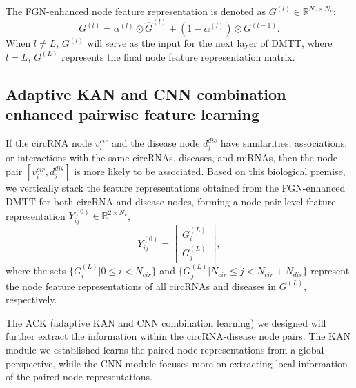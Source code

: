 \documentclass{bioinfo}
\begin{document}
\begin{methods}
The FGN-enhanced node feature representation is denoted as ${G}^{(l)} \in \mathbb{R}^{N_v \times N_v}$:
\begin{equation}
    {G}^{(l)} =  \alpha^{(l)} \odot \hat{G}^{(l)} + (1 - \alpha^{(l)}) \odot G^{(l - 1)}.
\end{equation}
When $l \neq L$, $G^{(l)}$ will serve as the input for the next layer of DMTT, where $l = L$, $G^{(L)}$ represents the final node feature representation matrix.

\vspace{0.3cm}


\subsection{Adaptive KAN and CNN combination enhanced pairwise feature learning}
If the circRNA node $v_i^{cir}$ and the disease node $d_j^{dis}$ have similarities, associations, or interactions with the same circRNAs, diseases, and miRNAs, then the node pair $[v_i^{cir}, d_j^{dis}]$ is more likely to be associated. Based on this biological premise, we vertically stack the feature representations obtained from the FGN-enhanced DMTT for both circRNA and disease nodes, forming a node pair-level feature representation ${Y_{ij}^{(0)}} \in \mathbb{R}^{2 \times N_v}$,
\begin{equation}
    {Y_{ij}^{(0)}} = \begin{bmatrix} {G^{(L)}_i} \\ {G^{(L)}_j} \end{bmatrix},
\end{equation}
where the sets $\{G^{(L)}_{i} | 0 \leqslant i < N_{cir}\}$ and $\{G^{(L)}_j | N_{cir} \leqslant j < N_{cir} + N_{dis}\}$ represent the node feature representations of all circRNAs and diseases in $G^{(L)}$, respectively.

The ACK (adaptive KAN and CNN combination learning) we designed will further extract the information within the circRNA-disease node pairs. The KAN module we established learns the paired node representations from a global perspective, while the CNN module focuses more on extracting local information of the paired node representations.

\vspace{0.3cm}


\end{methods}
\end{document}
